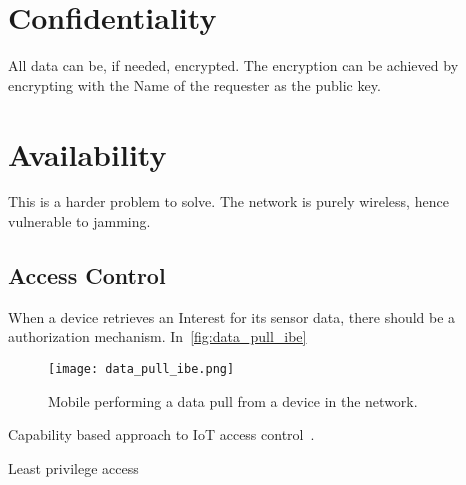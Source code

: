 \section{Confidentiality}

All data can be, if needed, encrypted.
The encryption can be achieved by encrypting with the Name of the requester as the public key.


\section{Availability}

This is a harder problem to solve.
The network is purely wireless, hence vulnerable to jamming. 

\subsection{Access Control}

When a device retrieves an Interest for its sensor data, there should be a authorization mechanism. 
In~\autoref{fig:data_pull_ibe} 
\begin{figure}[ht]
  \centering
  \texttt{[image: data\_pull\_ibe.png]}
  \caption{Mobile performing a data pull from a device in the network.}
  \label{fig:data_pull_ibe}
\end{figure}


Capability based approach to \gls{IoT} access control~\cite{DBLP:conf/imis/GusmeroliPR12}.

Least privilege access